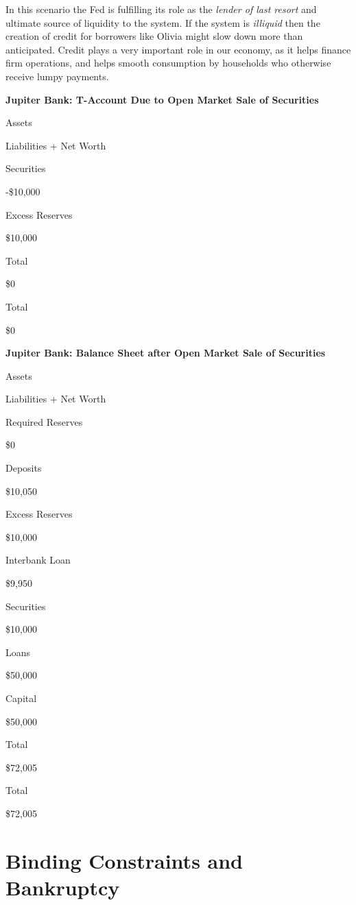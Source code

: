 \documentclass[
]{book}
\begin{document}
In this scenario the Fed is fulfilling its role as the \emph{lender of last resort} and ultimate source of liquidity to the system. If the system is \emph{illiquid} then the creation of credit for borrowers like Olivia might slow down more than anticipated. Credit plays a very important role in our economy, as it helps finance firm operations, and helps smooth consumption by households who otherwise receive lumpy payments.

\label{tab:t21}\textbf{Jupiter Bank: T-Account Due to Open Market Sale of Securities}

Assets

Liabilities + Net Worth

Securities

-\$10,000

Excess Reserves

\$10,000

Total

\$0

Total

\$0

\label{tab:t22}\textbf{Jupiter Bank: Balance Sheet after Open Market Sale of Securities}

Assets

Liabilities + Net Worth

Required Reserves

\$0

Deposits

\$10,050

Excess Reserves

\$10,000

Interbank Loan

\$9,950

Securities

\$10,000

Loans

\$50,000

Capital

\$50,000

Total

\$72,005

Total

\$72,005

\hypertarget{binding-constraints-and-bankruptcy}{%
\section{Binding Constraints and Bankruptcy}\label{binding-constraints-and-bankruptcy}}
\end{document}
